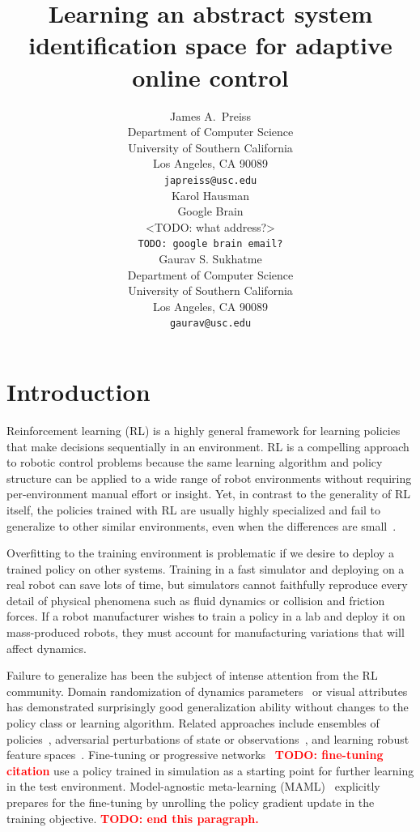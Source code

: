 \documentclass{article}
\title{Learning an abstract system identification space for adaptive online control}
\author{
  James A.~Preiss \\
  Department of Computer Science\\
  University of Southern California\\
  Los Angeles, CA 90089\\
  \texttt{japreiss@usc.edu} \\
  \And
  Karol Hausman \\
  Google Brain \\
  <TODO: what address?> \\
  \texttt{TODO: google brain email?} \\
  \AND
  Gaurav S. Sukhatme \\
  Department of Computer Science\\
  University of Southern California\\
  Los Angeles, CA 90089\\
  \texttt{gaurav@usc.edu} \\
}
\newcommand{\TODO}[1]{\textcolor{red}{\textbf{TODO: #1}}}
\begin{document}
\maketitle

\begin{abstract}
\end{abstract}

\section{Introduction}

Reinforcement learning (RL) is a highly general framework for learning policies that make decisions sequentially in an environment.
RL is a compelling approach to robotic control problems
because the same learning algorithm and policy structure can be applied to a wide range of robot environments
without requiring per-environment manual effort or insight.
Yet, in contrast to the generality of RL itself,
the policies trained with RL are usually highly specialized and fail to generalize to other similar environments,
even when the differences are small~\citep{zhang-study-on-overfitting}.

Overfitting to the training environment is problematic if we desire to deploy a trained policy on other systems.
Training in a fast simulator and deploying on a real robot can save lots of time,
but simulators cannot faithfully reproduce every detail of physical phenomena such as fluid dynamics or collision and friction forces.
If a robot manufacturer wishes to train a policy in a lab and deploy it on mass-produced robots,
they must account for manufacturing variations that will affect dynamics.

Failure to generalize has been the subject of intense attention from the RL community.
Domain randomization of dynamics parameters~\citep{antonova-pivoting-corr17, zhu-RL-IL-diverse}
or visual attributes~\citep{sadeghi-cad2rl-rss17,tobin-domainrand-arxiv17,james-domain-xfer}
has demonstrated surprisingly good generalization ability without changes to the policy class or learning algorithm.
Related approaches include ensembles of policies~\citep{actor-mimic,teh-distral},
adversarial perturbations of state or observations~\citep{pinto-robust-adversarial-RL,huang-adversarial-attacks},
and learning robust feature spaces~\citet{higgins-DARLA,bousmalis-domainseparation-nips16}.
Fine-tuning or progressive networks~\citet{rusu-progressive-nets} \TODO{fine-tuning citation}
use a policy trained in simulation as a starting point for further learning in the test environment.
Model-agnostic meta-learning (MAML)~\citep{finn-maml-icml17}
explicitly prepares for the fine-tuning by unrolling the policy gradient update in the training objective.
\TODO{end this paragraph.}
\end{document}
